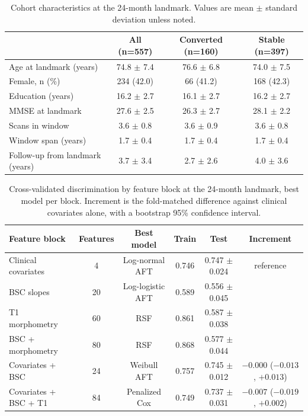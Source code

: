 \documentclass[blue]{ludusofficial}
\begin{document}
\begin{table}[t]
\centering
\caption{Cohort characteristics at the 24-month landmark. Values are mean $\pm$ standard deviation unless noted.}
\label{tab:cohort}
\small
\begin{tabular}{lccc}
\toprule
 & All (n=557) & Converted (n=160) & Stable (n=397) \\
\midrule
Age at landmark (years)      & 74.8 $\pm$ 7.4 & 76.6 $\pm$ 6.8 & 74.0 $\pm$ 7.5 \\
Female, n (\%)               & 234 (42.0)     & 66 (41.2)      & 168 (42.3) \\
Education (years)            & 16.2 $\pm$ 2.7 & 16.1 $\pm$ 2.7 & 16.2 $\pm$ 2.7 \\
MMSE at landmark             & 27.6 $\pm$ 2.5 & 26.3 $\pm$ 2.7 & 28.1 $\pm$ 2.2 \\
Scans in window              & 3.6 $\pm$ 0.8  & 3.6 $\pm$ 0.9  & 3.6 $\pm$ 0.8 \\
Window span (years)          & 1.7 $\pm$ 0.4  & 1.7 $\pm$ 0.4  & 1.7 $\pm$ 0.4 \\
Follow-up from landmark (years) & 3.7 $\pm$ 3.4 & 2.7 $\pm$ 2.6 & 4.0 $\pm$ 3.6 \\
\bottomrule
\end{tabular}
\end{table}

\begin{table}[t]
\centering
\caption{Cross-validated discrimination by feature block at the 24-month landmark, best model per block. Increment is the fold-matched difference against clinical covariates alone, with a bootstrap 95\% confidence interval.}
\label{tab:models}
\small
\begin{tabular}{lccccc}
\toprule
Feature block & Features & Best model & Train & Test & Increment \\
\midrule
Clinical covariates      & 4  & Log-normal AFT   & 0.746 & 0.747 $\pm$ 0.024 & reference \\
BSC slopes               & 20 & Log-logistic AFT & 0.589 & 0.556 $\pm$ 0.045 & \\
T1 morphometry           & 60 & RSF              & 0.861 & 0.587 $\pm$ 0.038 & \\
BSC + morphometry        & 80 & RSF              & 0.868 & 0.577 $\pm$ 0.044 & \\
Covariates + BSC         & 24 & Weibull AFT      & 0.757 & 0.745 $\pm$ 0.012 & $-0.000$ ($-0.013$, $+0.013$) \\
Covariates + BSC + T1    & 84 & Penalized Cox    & 0.749 & 0.737 $\pm$ 0.031 & $-0.007$ ($-0.019$, $+0.002$) \\
\bottomrule
\end{tabular}
\end{table}
\end{document}

